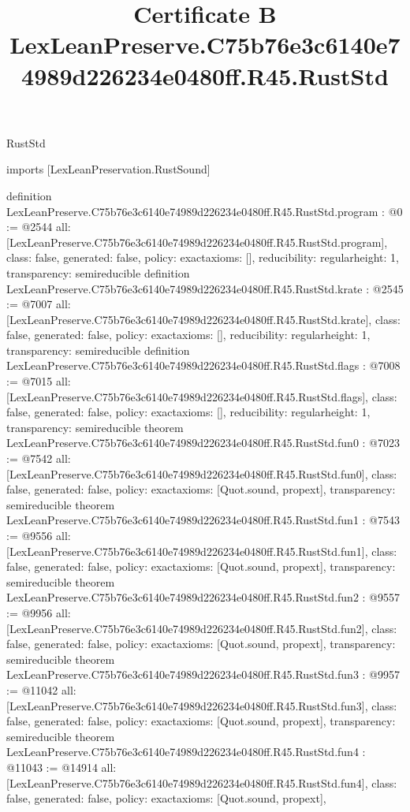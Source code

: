 \begin{lexlean}{RustStd}
\title{Certificate B LexLeanPreserve.C75b76e3c6140e74989d226234e0480ff.R45.RustStd}
\begin{coremodule}
imports [LexLeanPreservation.RustSound]

definition LexLeanPreserve.C75b76e3c6140e74989d226234e0480ff.R45.RustStd.program : @0 := @2544 {
  all: [LexLeanPreserve.C75b76e3c6140e74989d226234e0480ff.R45.RustStd.program],
  class: false,
  generated: false,
  policy: exact{axioms: []},
  reducibility: regular{height: 1},
  transparency: semireducible
}
definition LexLeanPreserve.C75b76e3c6140e74989d226234e0480ff.R45.RustStd.krate : @2545 := @7007 {
  all: [LexLeanPreserve.C75b76e3c6140e74989d226234e0480ff.R45.RustStd.krate],
  class: false,
  generated: false,
  policy: exact{axioms: []},
  reducibility: regular{height: 1},
  transparency: semireducible
}
definition LexLeanPreserve.C75b76e3c6140e74989d226234e0480ff.R45.RustStd.flags : @7008 := @7015 {
  all: [LexLeanPreserve.C75b76e3c6140e74989d226234e0480ff.R45.RustStd.flags],
  class: false,
  generated: false,
  policy: exact{axioms: []},
  reducibility: regular{height: 1},
  transparency: semireducible
}
theorem LexLeanPreserve.C75b76e3c6140e74989d226234e0480ff.R45.RustStd.fun0 : @7023 := @7542 {
  all: [LexLeanPreserve.C75b76e3c6140e74989d226234e0480ff.R45.RustStd.fun0],
  class: false,
  generated: false,
  policy: exact{axioms: [Quot.sound, propext]},
  transparency: semireducible
}
theorem LexLeanPreserve.C75b76e3c6140e74989d226234e0480ff.R45.RustStd.fun1 : @7543 := @9556 {
  all: [LexLeanPreserve.C75b76e3c6140e74989d226234e0480ff.R45.RustStd.fun1],
  class: false,
  generated: false,
  policy: exact{axioms: [Quot.sound, propext]},
  transparency: semireducible
}
theorem LexLeanPreserve.C75b76e3c6140e74989d226234e0480ff.R45.RustStd.fun2 : @9557 := @9956 {
  all: [LexLeanPreserve.C75b76e3c6140e74989d226234e0480ff.R45.RustStd.fun2],
  class: false,
  generated: false,
  policy: exact{axioms: [Quot.sound, propext]},
  transparency: semireducible
}
theorem LexLeanPreserve.C75b76e3c6140e74989d226234e0480ff.R45.RustStd.fun3 : @9957 := @11042 {
  all: [LexLeanPreserve.C75b76e3c6140e74989d226234e0480ff.R45.RustStd.fun3],
  class: false,
  generated: false,
  policy: exact{axioms: [Quot.sound, propext]},
  transparency: semireducible
}
theorem LexLeanPreserve.C75b76e3c6140e74989d226234e0480ff.R45.RustStd.fun4 : @11043 := @14914 {
  all: [LexLeanPreserve.C75b76e3c6140e74989d226234e0480ff.R45.RustStd.fun4],
  class: false,
  generated: false,
  policy: exact{axioms: [Quot.sound, propext]},
}
\end{coremodule}
\end{lexlean}
